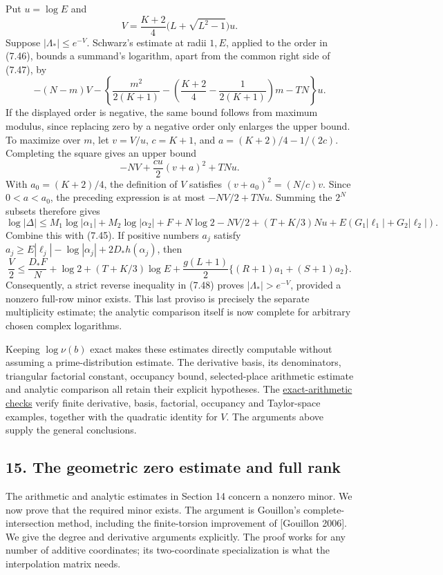 \documentclass[
  11pt,
  a4paper,
]{article}
\begin{document}
Put \(u=\log E\) and \[
V=\frac{K+2}{4}\bigl(L+\sqrt{L^2-1}\bigr)u.
\] Suppose \(|\Lambda_*|\le e^{-V}\). Schwarz's estimate at radii
\(1,E\), applied to the order in (7.46), bounds a summand's logarithm,
apart from the common right side of (7.47), by \[
-(N-m)V-
\left\{\frac{m^2}{2(K+1)}-
\left(\frac{K+2}{4}-\frac1{2(K+1)}\right)m-TN\right\}u.
\] If the displayed order is negative, the same bound follows from
maximum modulus, since replacing zero by a negative order only enlarges
the upper bound. To maximize over \(m\), let \(v=V/u\), \(c=K+1\), and
\(a=(K+2)/4-1/(2c)\). Completing the square gives an upper bound \[
-NV+\frac{cu}{2}(v+a)^2+TNu.
\] With \(a_0=(K+2)/4\), the definition of \(V\) satisfies
\((v+a_0)^2=(N/c)v\). Since \(0<a<a_0\), the preceding expression is at
most \(-NV/2+TNu\). Summing the \(2^N\) subsets therefore gives \[
\log|\Delta|\le M_1\log|\alpha_1|+M_2\log|\alpha_2|
+F+N\log2-NV/2+(T+K/3)Nu
+E(G_1|\ell_1|+G_2|\ell_2|).
\] Combine this with (7.45). If positive numbers \(a_j\) satisfy
\(a_j\ge E|\ell_j|-\log|\alpha_j|+2D_*h(\alpha_j)\), then \[
\frac V2\le\frac{D_*F}{N}+\log2+(T+K/3)\log E
+\frac{g(L+1)}2\{(R+1)a_1+(S+1)a_2\}. \tag{7.48}
\] Consequently, a strict reverse inequality in (7.48) proves
\(|\Lambda_*|>e^{-V}\), provided a nonzero full-row minor exists. This
last proviso is precisely the separate multiplicity estimate; the
analytic comparison itself is now complete for arbitrary chosen complex
logarithms.

Keeping \(\log\nu(b)\) exact makes these estimates directly computable
without assuming a prime-distribution estimate. The derivative basis,
its denominators, triangular factorial constant, occupancy bound,
selected-place arithmetic estimate and analytic comparison all retain
their explicit hypotheses. The
\href{https://kokunoyumeto.github.io/open-math-courses-public/courses/TR-BAKER/verification/gouillon_arithmetic.py}{exact-arithmetic checks}
verify finite derivative, basis, factorial, occupancy and Taylor-space
examples, together with the quadratic identity for \(V\). The arguments
above supply the general conclusions.

\subsection{15. The geometric zero estimate and full
rank}\label{the-geometric-zero-estimate-and-full-rank}

The arithmetic and analytic estimates in Section 14 concern a nonzero
minor. We now prove that the required minor exists. The argument is
Gouillon's complete-intersection method, including the finite-torsion
improvement of {[}Gouillon 2006{]}. We give the degree and derivative
arguments explicitly. The proof works for any number of additive
coordinates; its two-coordinate specialization is what the interpolation
matrix needs.
\end{document}
